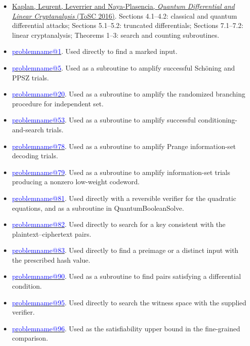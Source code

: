 \documentclass[11pt,a4paper]{article}
\makeatletter
\theoremstyle{problemstyle}
\newenvironment{algorithmindex}[1]{%
  \begin{itemize}[label=\textbullet,leftmargin=1.3em,labelsep=0.6em,itemsep=4pt,topsep=3pt,parsep=0pt]
  \small
}{\end{itemize}}
\newcommand{\problemref}[1]{\hyperref[entry:#1]{\textcolor{blue}{\csname problemname@#1\endcsname}}}
\makeatother
\begin{document}
\begin{algorithmindex}{grover}
\item \href{https://arxiv.org/pdf/1510.05836}{Kaplan, Leurent, Leverrier and Naya-Plasencia, \emph{Quantum Differential and Linear Cryptanalysis} (ToSC 2016)}. Sections 4.1--4.2: classical and quantum differential attacks; Sections 5.1--5.2: truncated differentials; Sections 7.1--7.2: linear cryptanalysis; Theorems 1--3: search and counting subroutines.

\end{algorithmindex}

\begin{itemize}[label=\textbullet,leftmargin=1.3em,itemsep=2pt,topsep=3pt,parsep=0pt]\small

\item \problemref{1}. Used directly to find a marked input.

\item \problemref{5}. Used as a subroutine to amplify successful Sch\"oning and PPSZ trials.

\item \problemref{20}. Used as a subroutine to amplify the randomized branching procedure for independent set.

\item \problemref{53}. Used as a subroutine to amplify successful conditioning-and-search trials.

\item \problemref{78}. Used as a subroutine to amplify Prange information-set decoding trials.

\item \problemref{79}. Used as a subroutine to amplify information-set trials producing a nonzero low-weight codeword.

\item \problemref{81}. Used directly with a reversible verifier for the quadratic equations, and as a subroutine in QuantumBooleanSolve.

\item \problemref{82}. Used directly to search for a key consistent with the plaintext--ciphertext pairs.

\item \problemref{83}. Used directly to find a preimage or a distinct input with the prescribed hash value.

\item \problemref{90}. Used as a subroutine to find pairs satisfying a differential condition.

\item \problemref{95}. Used directly to search the witness space with the supplied verifier.

\item \problemref{96}. Used as the satisfiability upper bound in the fine-grained comparison.

\end{itemize}
\end{document}
